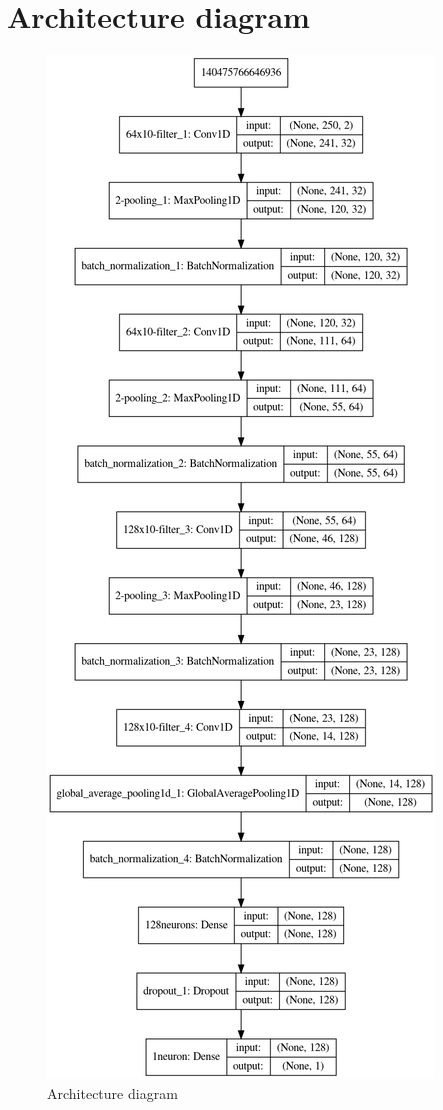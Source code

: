 \documentclass[a4paper, twoside]{article}
\begin{document}
\newpage

\nocite{*}





\newpage

\appendix
\section{Architecture diagram}

\begin{figure}[H]
    \centering
    \includegraphics[width=0.50\linewidth]{model_mode0.png}
    \caption{Architecture diagram}
\end{figure}
\end{document}
